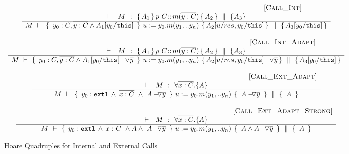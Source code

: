 \begin{figure}[htb]
\small{
$\begin{array}{c}
 \inferruleSD{\hspace{4.7cm} [\sc{Call\_Int}]}
	{
	   	\begin{array}{l}
		\promises  M {\mprepostN{A_1}{p\ C}{m}{y}{C}{A_2} {A_3}}  
          	\end{array}
		}
	{  \hprovesN {M} 
						{ \  y_0:C,\overline {y:C} \wedge  A_1[y_0/\prg{this}] \ }
						 { \ u:=y_0.m(y_1,.. y_n)\    }
					         { A_2[ u/res,y_0/\prg{this}] } 
						{   A_3[y_0/\prg{this}]   }	
}
 \\
\\
{ \inferruleSD{\hspace{4.7cm} [\sc{Call\_Int\_Adapt}]}
	{
	   	\begin{array}{l}
		\promises  M {\mprepostN{A_1}{p\ C}{m}{y}{C}{A_2} {A_3}}  
          	\end{array}
		}
	{  \hprovesN {M} 
						{ \  y_0:C, \overline {y:C} \wedge {\PushAS {y}{A_1[y_0/\prg{this}]}}  \ }  
						{ \ u:=y_0.m(y_1,.. y_n)\    }
						{  { \PushAS {y}{A_2[ u/res,y_0/\prg{this}]}}   }
						{   A_3[y_0/\prg{this}]  }	
}
}
\\
 \\ 
 \inferruleSD{\hspace{4.7cm} [\sc{Call\_Ext}\_Adapt]}
 	{ 
   	 \promises M   {\TwoStatesN {\overline {x:C}} {A}} 
        }
	{   \hprovesN{M} 
						{ \    { \external{y_0}} \,     \wedge \,  \overline{x:C}\  \wedge\ {\PushAS {y}{A}}\ }  
						{ \ u:=y_0.m(y_1,.. y_n)\    }
						{ \   {\PushAS {y}{A}}  \ }
						{\  A \   }	
}
\\
 \\ 
{
 \inferruleSD{\hspace{4.7cm} [\sc{Call\_Ext}\_Adapt\_Strong]}
 	{ 
   	 \promises M   {\TwoStatesN {\overline {x:C}} {A}} 
        }
	{   \hprovesN{M} 
						{ \    { \external{y_0}} \,     \wedge \,  \overline{x:C}\ \wedge  A   \wedge\ {\PushAS {y}{A}}\ }  
						{ \ u:=y_0.m(y_1,.. y_n)\    }
						{ \   A \wedge {\PushAS {y}{A}}  \ }
						{\  A \   }	
}
}

\end{array}
$
}
\caption{Hoare Quadruples for Internal and External Calls}
\label{f:internal:calls}
\label{f:external:calls}
\label{f:calls}
\end{figure}

